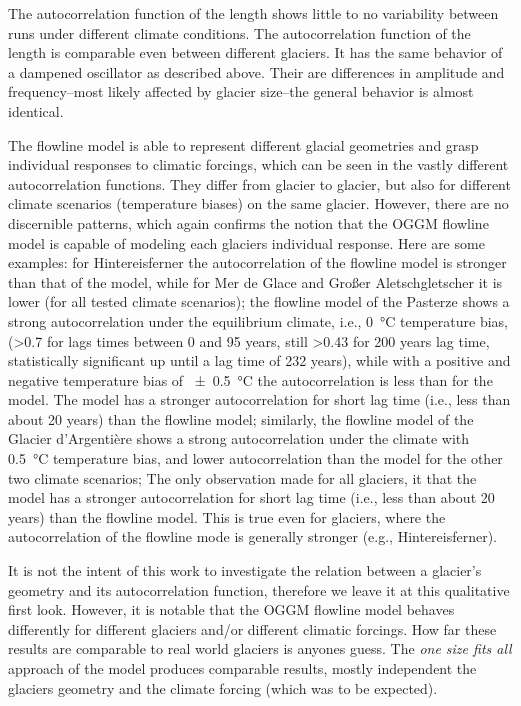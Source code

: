       The autocorrelation function of the \vas{} length shows little to no variability between runs under different climate conditions. %
      The autocorrelation function of the \vas{} length is comparable even between different glaciers. It has the same behavior of a dampened oscillator as described above. Their are differences in amplitude and frequency--most likely affected by glacier size--the general behavior is almost identical. 
      
      The flowline model is able to represent different glacial geometries and grasp individual responses to climatic forcings, which can be seen in the vastly different autocorrelation functions. They differ from glacier to glacier, but also for different climate scenarios (temperature biases) on the same glacier. However, there are no discernible patterns, which again confirms the notion that the OGGM flowline model is capable of modeling each glaciers individual response. Here are some examples: for Hintereisferner the autocorrelation of the flowline model is stronger than that of the \vas{} model, while for Mer de Glace and Großer Aletschgletscher it is lower (for all tested climate scenarios); the flowline model of the Pasterze shows a strong autocorrelation under the equilibrium climate, i.e., \SI{0}{\celsius} temperature bias, (>0.7 for lags times between 0 and 95 years, still >0.43 for 200 years lag time, statistically significant up until a lag time of 232 years), while with a positive and negative temperature bias of \SI{\pm0.5}{\celsius} the autocorrelation is less than for the \vas{} model.
      The \vas{} model has a stronger autocorrelation for short lag time (i.e., less than about 20 years) than the flowline model; similarly, the flowline model of the Glacier d'Argentière shows a strong autocorrelation under the climate with \SI{+0.5}{\celsius} temperature bias, and lower autocorrelation than the \vas{} model for the other two climate scenarios; The only observation made for all glaciers, it that the \vas{} model has a stronger autocorrelation for short lag time (i.e., less than about 20 years) than the flowline model. This is true even for glaciers, where the autocorrelation of the flowline mode is generally stronger (e.g., Hintereisferner). 

      It is not the intent of this work to investigate the relation between a glacier's geometry and its autocorrelation function, therefore we leave it at this qualitative first look. However, it is notable that the OGGM flowline model behaves differently for different glaciers and/or different climatic forcings. How far these results are comparable to real world glaciers is anyones guess. The \textit{one size fits all} approach of the \vas{} model produces comparable results, mostly independent the glaciers geometry and the climate forcing (which was to be expected).


